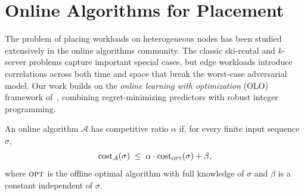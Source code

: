 \section{Online Algorithms for Placement}

The problem of placing workloads on heterogeneous nodes has been studied
extensively in the online algorithms community. The classic ski-rental and
\(k\)-server problems capture important special cases, but edge workloads
introduce correlations across both time and space that break the worst-case
adversarial model. Our work builds on the \emph{online learning with
optimization} (OLO) framework of~\citet{hazan2016introduction}, combining
regret-minimizing predictors with robust integer programming.

\begin{definition}
\label{def:cr}
An online algorithm \(\mathcal{A}\) has competitive ratio \(\alpha\) if, for
every finite input sequence \(\sigma\),
\[
\operatorname{cost}_{\mathcal{A}}(\sigma)
\;\leq\;
\alpha \cdot \operatorname{cost}_{\textsc{opt}}(\sigma) + \beta,
\]
where \(\textsc{opt}\) is the offline optimal algorithm with full knowledge of
\(\sigma\) and \(\beta\) is a constant independent of \(\sigma\).
\end{definition}

